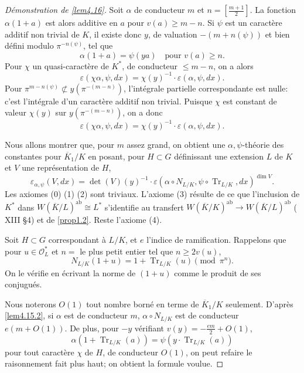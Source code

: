 \documentclass[11pt,a4paper]{amsart}
\theoremstyle{plain}
\theoremstyle{definition}
\DeclareMathOperator{\Tr}{Tr}
\newcommand{\ab}{\mathrm{ab}}
\def\dim{\mathop{\mathrm{dim}}\nolimits}
\newcommand{\scrO}{\mathscr{O}}
\newcommand{\ov}[1]{\overline{#1}}
\newcommand{\eps}{\varepsilon}
\begin{document}
\begin{proof}[D\'emonstration de \ref{lem4.16}]
Soit $\alpha$ de conducteur $m$ et $n = \left[\frac{m+1}{2}\right]$. La fonction $\alpha(1+a)$ est alors additive en $a$ pour $v(a) \geq m-n$. Si $\psi$ est un caract\`ere additif non trivial de $K$, il existe donc $y$, de valuation $-(m+n(\psi))$ et bien d\'efini modulo $\pi^{-n(\psi)}$, tel que
\[
\alpha(1+a) = \psi(ya) \quad \text{pour } v(a) \geq n.
\]
Pour $\chi$ un quasi-caract\`ere de $K^{*}$, de conducteur $\leq m-n$, on a alors
\begin{equation}\label{eq4.16.1}
\eps(\chi\alpha, \psi, dx) = \chi(y)^{-1} \cdot \eps(\alpha, \psi, dx).
\end{equation}
Pour $\pi^{m-n(\psi)} \not\subset y(\pi^{-(m-n)})$, l'int\'egrale partielle correspondante est nulle: c'est l'int\'egrale d'un caract\`ere additif non trivial. Puisque $\chi$ est constant de valeur $\chi(y)$ sur $y(\pi^{-(m-n)})$, on a donc
\[
\eps(\chi\alpha,\psi,dx) = \chi(y)^{-1} \cdot \eps(\alpha,\psi,dx).
\]

Nous allons montrer que, pour $m$ assez grand, on obtient une $\alpha,\psi$-th\'eorie des constantes pour $\ov{K}_{1}/K$ en posant, pour $H \subset G$ d\'efinissant une extension $L$ de $K$ et $V$ une repr\'esentation de $H$,
\[
\eps_{\alpha,\psi}(V,dx) = \det(V)(y)^{-1} \cdot \eps(\alpha \circ N_{L/K}, \psi \circ \Tr_{L/K}, dx)^{\dim V}.
\]
Les axiomes (0) (1) (2) sont triviaux. L'axiome (3) r\'esulte de ce que l'inclusion de $K^{*}$ dans $W(\ov{K}/L)^{\ab} \cong L^{*}$ s'identifie au transfert $W(\ov{K}/K)^{\ab} \to W(\ov{K}/L)^{\ab}$ (\cite{10} XIII \S4) et de \ref{prop1.2}. Reste l'axiome (4).

Soit $H \subset G$ correspondant \`a $L/K$, et $e$ l'indice de ramification. Rappelons que pour $u \in \scrO_{L}^{*}$ et $n = $ le plus petit entier tel que $n \geq 2v(u)$,
\begin{equation}\label{eq4.16.2}
N_{L/K}(1+u) = 1 + \Tr_{L/K}(u) \pmod{\pi^{n}}.
\end{equation}
On le v\'erifie en \'ecrivant la norme de $(1+u)$ comme le produit de ses conjugu\'es.

Nous noterons $O(1)$ tout nombre born\'e en terme de $\ov{K}_{1}/K$ seulement. D'apr\`es \ref{lem4.15.2}, si $\alpha$ est de conducteur $m$, $\alpha \circ N_{L/K}$ est de conducteur $e(m+O(1))$. De plus, pour $-y$ v\'erifiant $v(y) = -\frac{em}{2} + O(1)$,
\[
\alpha(1+\Tr_{L/K}(a)) = \psi(y \cdot \Tr_{L/K}(a))
\]
pour tout caract\`ere $\chi$ de $H$, de conducteur $O(1)$, on peut refaire le raisonnement fait plus haut; on obtient la formule voulue.
\end{proof}
\end{document}

